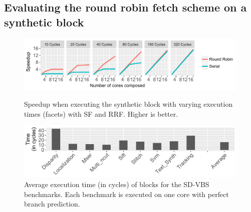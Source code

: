 \vspace{-1em}
\subsection{Evaluating the round robin fetch scheme on a synthetic block}

\begin{figure}[t]
    \centering
    \includegraphics[width=1\textwidth]{chapter3/graphics/motivation_fetch2.pdf}
   	\vspace{-2.5em}
 \caption{Speedup when executing the synthetic block with varying execution times (facets) with SF and RRF. Higher is better.}
    \label{fig:motiv_res}
    \centering
    \includegraphics[width=1\textwidth]{chapter3/graphics/sdvbsav.pdf}
    
	\vspace{-0.5em}
	\caption{Average execution time (in cycles) of blocks for the SD-VBS benchmarks. Each benchmark is executed on one core with perfect branch prediction.}
    \label{fig:svdbs_av}
\vspace{1em}
\end{figure}

